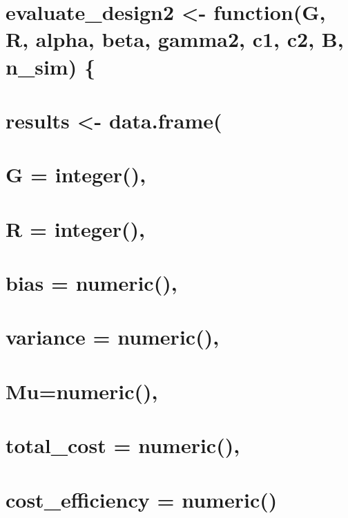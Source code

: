 \documentclass[
]{article}
\begin{document}
\hypertarget{evaluate_design2---functiong-r-alpha-beta-gamma2-c1-c2-b-n_sim}{%
\section{evaluate\_design2 \textless- function(G, R, alpha, beta,
gamma2, c1, c2, B, n\_sim)
\{}\label{evaluate_design2---functiong-r-alpha-beta-gamma2-c1-c2-b-n_sim}}

\hypertarget{results---data.frame}{%
\section{results \textless- data.frame(}\label{results---data.frame}}

\hypertarget{g-integer}{%
\section{G = integer(),}\label{g-integer}}

\hypertarget{r-integer}{%
\section{R = integer(),}\label{r-integer}}

\hypertarget{bias-numeric}{%
\section{bias = numeric(),}\label{bias-numeric}}

\hypertarget{variance-numeric}{%
\section{variance = numeric(),}\label{variance-numeric}}

\hypertarget{munumeric}{%
\section{Mu=numeric(),}\label{munumeric}}

\hypertarget{total_cost-numeric}{%
\section{total\_cost = numeric(),}\label{total_cost-numeric}}

\hypertarget{cost_efficiency-numeric}{%
\section{cost\_efficiency = numeric()}\label{cost_efficiency-numeric}}
\end{document}
